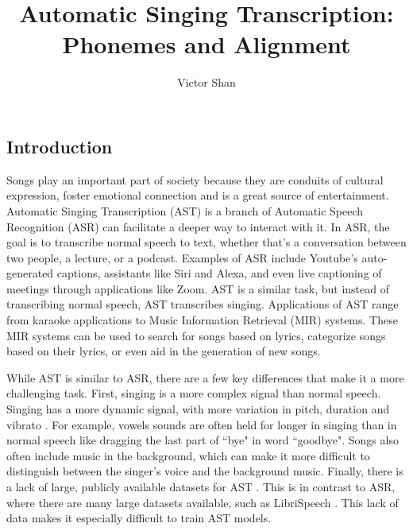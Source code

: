 \documentclass[letterpaper, 12pt]{article}
\title{Automatic Singing Transcription: Phonemes and Alignment}
\author{Victor Shan}
\begin{document}
\maketitle
\begin{multicols*}{2}
\begin{abstract}
\end{abstract}

\section{Introduction}

Songs play an important part of society because they are conduits of cultural expression,
foster emotional connection and is a great source of entertainment. Automatic Singing Transcription
(AST) is a branch of Automatic Speech Recognition (ASR) can facilitate a deeper way to interact with
it. In ASR, the goal is to transcribe normal speech to text,
whether that's a conversation between two people, a lecture, or a podcast. Examples of ASR include
Youtube's auto-generated captions, assistants like Siri and Alexa, and even live captioning of
meetings through applications like Zoom. AST is a similar task, but instead of transcribing normal
speech, AST transcribes singing. Applications of AST range from karaoke applications to Music
Information Retrieval (MIR) systems. These MIR systems can be used to search for songs based on
lyrics, categorize songs based on their lyrics, or even aid in the generation of new songs.

While AST is similar to ASR, there are a few key differences that make it a more challenging task.
First, singing is a more complex signal than normal speech. Singing has a more dynamic signal, with
more variation in pitch, duration and vibrato \citep{SemiSupervisedSolo}.
For example, vowels sounds are often held for longer in singing than in normal speech like dragging
the last part of ``bye" in word ``goodbye". Songs also often include music in the background, which can
make it more difficult to distinguish between the singer's voice and the background music. Finally,
there is a lack of large, publicly available datasets for AST \citep{DALI}. This is in contrast to ASR, where
there are many large datasets available, such as LibriSpeech \citep{Librispeech}. This lack of data
makes it especially difficult to train AST models.


\end{multicols*}
\end{document}
